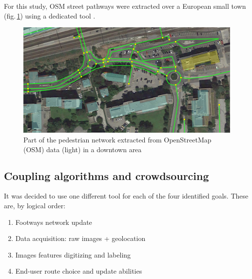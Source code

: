 \documentclass[10pt,conference,a4paper]{IEEEtran}
\begin{document}
For this study, OSM street pathways were extracted over a European small town (fig.\,\ref{pedestriangraph}) using a dedicated tool \cite{boeing_osmnx:_2017}.

\begin{figure}[ht]
\begin{center}
\includegraphics[width=1.0\linewidth]{OSM_walk_graph_022.jpg}
\end{center}
   \caption{Part of the pedestrian network extracted from OpenStreetMap (OSM) data (light) in a downtown area}\label{pedestriangraph}
\end{figure}


\subsection{Coupling algorithms and crowdsourcing}

It was decided to use one different tool for each of the four identified goals. These are, by logical order:

\begin{enumerate}\setlength\itemsep{0.0em}
\item Footways network update
\item Data acquisition: raw images + geolocation %
\item Images features digitizing and labeling %
\item End-user route choice and update abilities
\end{enumerate}
\end{document}
